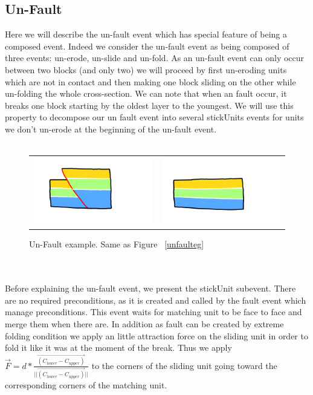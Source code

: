 \documentclass[12pt, a4paper]{report} %
\begin{document}
\subsection{Un-Fault}
\label{sub:unfault}
Here we will describe the un-fault event which has special feature of being a composed event. Indeed we consider the un-fault event as being composed of three events: un-erode, un-slide and un-fold. As an un-fault event can only occur between two blocks (and only two) we will proceed by first un-eroding units which are not in contact and then making one block sliding on the other while un-folding the whole cross-section. We can note that when an fault occur, it breaks one block starting by the oldest layer to the youngest. We will use this property to decompose our un fault event into several stickUnits events for units we don't un-erode at the beginning of the un-fault event.\\\\
\begin{figure}[htb]
\centering
\begin{tabular}{@{}cc@{}}
\includegraphics[width=.45\textwidth]{unFaultDescription0.png}&
\includegraphics[width=.45\textwidth]{unFaultDescription1.png}\\
\end{tabular}
\caption{Un-Fault example. Same as Figure ~\ref{unfaulteg}}
\label{unfaulteg2}
\end{figure}\\\\
Before explaining the un-fault event, we present the stickUnit subevent. There are no required preconditions, as it is created and called by the fault event which manage preconditions. This event waits for matching unit to be face to face and merge them when there are. In addition as fault can be created by extreme folding condition we apply an little attraction force on the sliding unit in order to fold it like it was at the moment of the break. Thus we apply $\overrightarrow{F} = d*\frac{\overrightarrow{(C_{lower} - C_{upper})} }{||\overrightarrow{(C_{lower} - C_{upper})}||}$ to the corners of the sliding unit going toward the corresponding corners of the matching unit.\\\\
\end{document}
